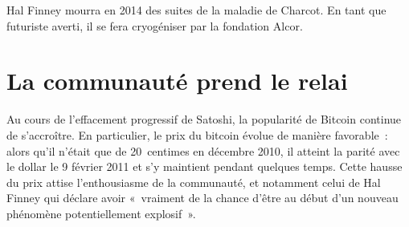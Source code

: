 Hal Finney mourra en 2014 des suites de la maladie de Charcot. En tant que futuriste averti, il se fera cryogéniser par la fondation Alcor.

\section*{La communauté prend le relai}

Au cours de l'effacement progressif de Satoshi, la popularité de Bitcoin continue de s'accroître. En particulier, le prix du bitcoin évolue de manière favorable~: alors qu'il n'était que de 20~centimes en décembre 2010, il atteint la parité avec le dollar le 9 février 2011 et s'y maintient pendant quelques temps. Cette hausse du prix attise l'enthousiasme de la communauté, et notamment celui de Hal Finney qui déclare avoir «~vraiment de la chance d'être au début d'un nouveau phénomène potentiellement explosif~».


